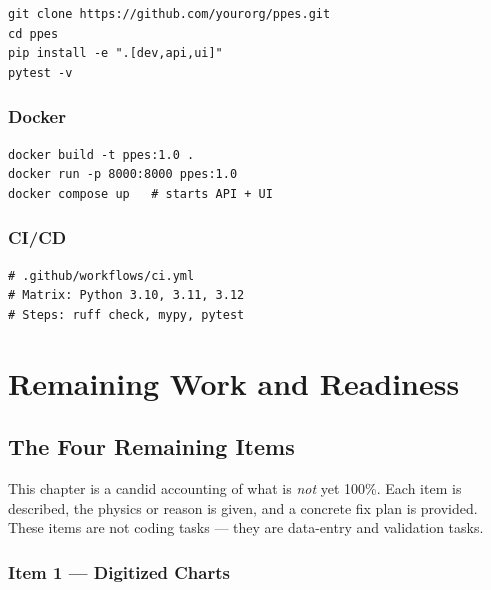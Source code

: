 \documentclass[11pt,a4paper,openany]{book}
\begin{document}
\begin{lstlisting}[style=bash]
git clone https://github.com/yourorg/ppes.git
cd ppes
pip install -e ".[dev,api,ui]"
pytest -v
\end{lstlisting}

\section{Docker}

\begin{lstlisting}[style=bash]
docker build -t ppes:1.0 .
docker run -p 8000:8000 ppes:1.0
docker compose up   # starts API + UI
\end{lstlisting}

\section{CI/CD}

\begin{lstlisting}[style=bash]
# .github/workflows/ci.yml
# Matrix: Python 3.10, 3.11, 3.12
# Steps: ruff check, mypy, pytest
\end{lstlisting}

\part{Remaining Work and Readiness}

\chapter{The Four Remaining Items}

\begin{purpose}
This chapter is a candid accounting of what is \emph{not} yet 100\%.
Each item is described, the physics or reason is given, and a concrete
fix plan is provided. These items are not coding tasks — they are
data-entry and validation tasks.
\end{purpose}

\section{Item 1 — Digitized Charts}
\end{document}
